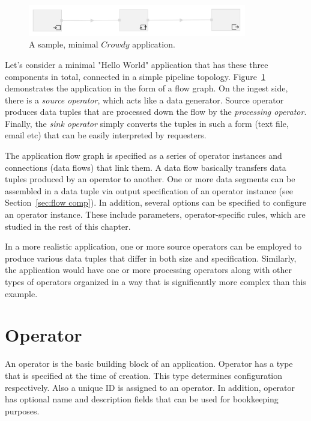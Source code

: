 \begin{figure}[ht]
	\centering
	\includegraphics[width=0.85\textwidth]{figures/helloworld.png}
	\caption{A sample, minimal $Crowdy$ application.}
	\label{fig:hello world}
\end{figure}

Let's consider a minimal "Hello World" application that has these three components 
in total, connected in a simple pipeline topology. Figure~\ref{fig:hello world} demonstrates 
the application in the form of a flow graph. On the ingest side, there is a 
\textit{source operator}, which acts like a data generator. Source operator produces 
data tuples that are processed down the flow by the 
\textit{processing operator}. Finally, the \textit{sink operator} simply converts the tuples 
in such a form (text file, email etc) that can be easily interpreted by requesters.

The application flow graph is specified as a series of operator instances and connections 
(data flows) that link them. A data flow basically transfers data tuples 
produced by an operator to another. One or more data segments can be assembled in a 
data tuple via output specification of an operator instance (see Section~\ref{sec:flow comp}). 
In addition, several options can be specified to configure an operator instance. These 
include parameters, operator-specific rules, which are studied in the rest of this chapter.

In a more realistic application, one or more source operators can be employed to produce 
various data tuples that differ in both size and specification. Similarly, the application would 
have one or more processing operators along with other types of operators organized in a way 
that is significantly more complex than this example.

\section{Operator}
\label{sec:operator}
An operator is the basic building block of an application. Operator has a type that is 
specified at the time of creation. This type determines configuration respectively. Also a 
unique ID is assigned to an operator. In addition, operator has optional name and 
description fields that can be used for bookkeeping purposes.

